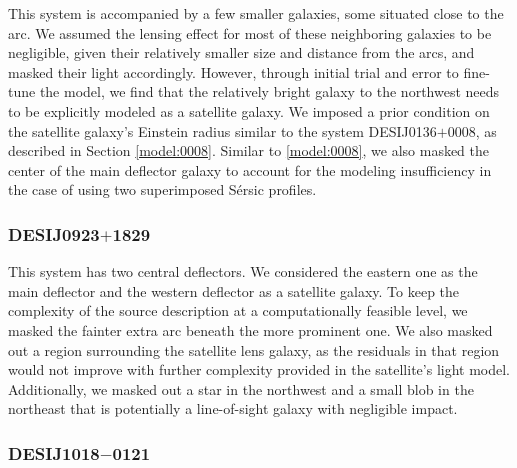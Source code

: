 \documentclass{aa}
\newcommand{\newedit}[1]{{#1}} %
\begin{document}
This system is accompanied by a few smaller galaxies, some situated close to the arc. We assumed the lensing effect for most of these neighboring galaxies to be negligible, given their relatively smaller size and distance from the arcs, and masked their light accordingly. However, through initial trial and error to fine-tune the model, we find that the relatively bright galaxy to the northwest needs to be explicitly modeled as a satellite galaxy. \newedit{We imposed a prior condition on the satellite galaxy's Einstein radius similar to the system DESIJ0136$+$0008, as described in Section \ref{model:0008}.} Similar to \ref{model:0008}, we also masked the center of the main deflector galaxy to account for the modeling insufficiency in the case of using two superimposed S\'ersic profiles.




\subsubsection{DESIJ0923$+$1829}

This system has two central deflectors. We considered the eastern one as the main deflector and the western deflector as a satellite galaxy. To keep the complexity of the source description at a computationally feasible level, we masked the fainter extra arc beneath the more prominent one. We also masked out a region surrounding the satellite lens galaxy, as the residuals in that region would not improve with further complexity provided in the satellite's light model. Additionally, we masked out a star in the northwest and a small blob in the northeast that is potentially a line-of-sight galaxy with negligible impact. 

\subsubsection{DESIJ1018$-$0121}
\end{document}
